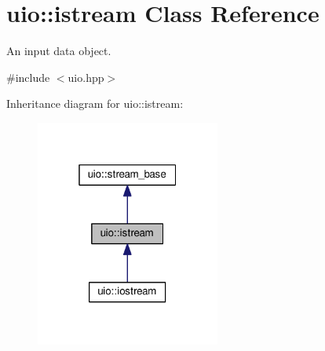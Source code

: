 \hypertarget{classuio_1_1istream}{}\section{uio\+:\+:istream Class Reference}
\label{classuio_1_1istream}


An input data object.  




{\ttfamily \#include $<$uio.\+hpp$>$}



Inheritance diagram for uio\+:\+:istream\+:\nopagebreak
\begin{figure}[H]
\begin{center}
\leavevmode
\includegraphics[width=172pt]{classuio_1_1istream__inherit__graph}
\end{center}
\end{figure}
